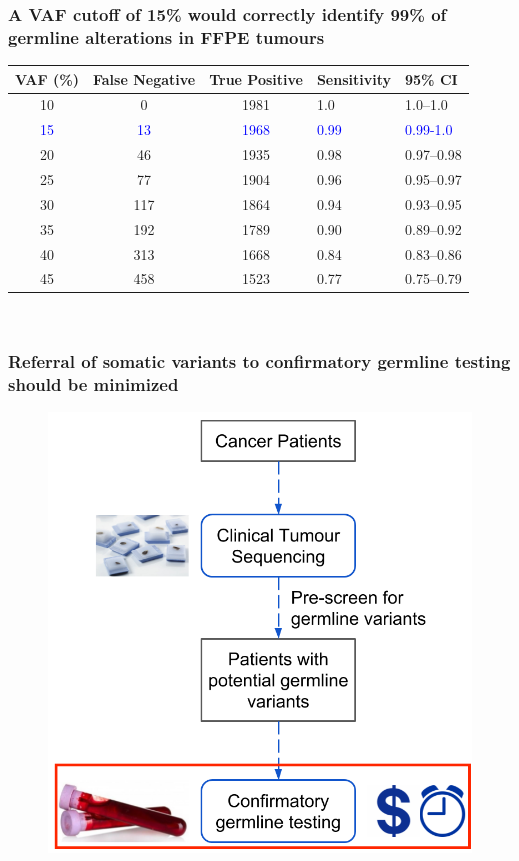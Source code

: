 \documentclass{beamer}
\begin{document}
\begin{frame}
\frametitle{A VAF cutoff of 15\% would correctly identify 99\% of germline alterations in FFPE tumours}
\centering
\begin{table}
\footnotesize
\centering
      \begin{tabular}{ccc|ll}
        \hline
        VAF (\%) & False Negative & True Positive & Sensitivity & 95\% CI
        \\
        \hline
        10 & 0 & 1981 & 1.0 & 1.0--1.0
        \\
        \textcolor{blue}{15} & \textcolor{blue}{13} & \textcolor{blue}{1968} & \textcolor{blue}{0.99} & \textcolor{blue}{0.99-1.0}
        \\
        20 & 46 & 1935 & 0.98 & 0.97--0.98
        \\
        25 & 77 & 1904 & 0.96 & 0.95--0.97
        \\
        30 & 117 & 1864 & 0.94 & 0.93--0.95
        \\
        35 & 192 & 1789 & 0.90 & 0.89--0.92
        \\
        40 & 313 & 1668 & 0.84 & 0.83--0.86
        \\
        45 & 458 & 1523 & 0.77 & 0.75--0.79
        \\
				\hline
      \end{tabular} \\
\end{table}
\end{frame}

\begin{frame}
\frametitle{Referral of somatic variants to confirmatory germline testing should be minimized}
\begin{figure}[t]
    \includegraphics[scale=0.22]{opportunity_clinical_sequencing_research_question2.png}
\end{figure}
\end{frame}
\end{document}
